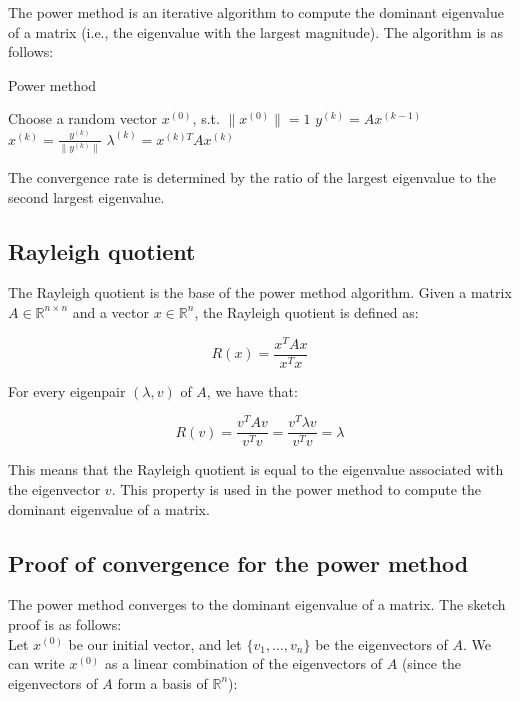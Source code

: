 The power method is an iterative algorithm to compute the dominant eigenvalue of a matrix (i.e., the eigenvalue with the largest
magnitude). The algorithm is as follows:

\begin{algorithm}[H]
    \caption{Power method}
    \begin{algorithmic}[1]
        \State Choose a random vector $x^{(0)}$, s.t. $\|x^{(0)}\| = 1$
            \State $y^{(k)} = A x^{(k-1)}$
            \State $x^{(k)} = \frac{y^{(k)}}{\|y^{(k)}\|}$
            \State $\lambda^{(k)} = x^{(k)T} A x^{(k)}$
        \EndFor
    \end{algorithmic}
\end{algorithm}

The convergence rate is determined by the ratio of the largest eigenvalue to the 
second largest eigenvalue.

\subsection{Rayleigh quotient}

The Rayleigh quotient is the base of the power method algorithm. Given a matrix $A \in \mathbb{R}^{n \times n}$ and
a vector $x \in \mathbb{R}^n$, the Rayleigh quotient is defined as:

\begin{equation}
    R(x) = \frac{x^T A x}{x^T x}
\end{equation}

For every eigenpair $(\lambda, v)$ of $A$, we have that:

\begin{equation}
    R(v) = \frac{v^T A v}{v^T v} = \frac{v^T \lambda v}{v^T v} = \lambda
\end{equation}

This means that the Rayleigh quotient is equal to the eigenvalue associated with the eigenvector $v$. This property
is used in the power method to compute the dominant eigenvalue of a matrix.

\subsection{Proof of convergence for the power method}

The power method converges to the dominant eigenvalue of a matrix. The sketch proof is as follows:\\

Let $x^{(0)}$ be our initial vector, and let $\{v_1, \ldots, v_n\}$ be the eigenvectors of $A$. We can write $x^{(0)}$ as a linear
combination of the eigenvectors of $A$ (since the eigenvectors of $A$ form a basis of $\mathbb{R}^n$):

